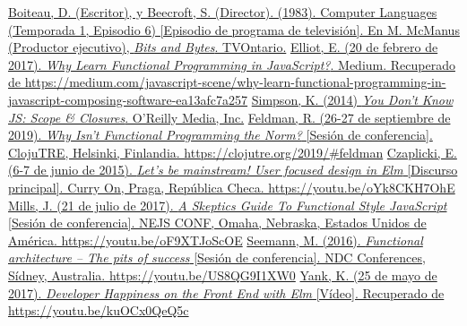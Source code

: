 \documentclass{article}
\begin{document}
\pagebreak
\begin{thebibliography}{99}
   \href{https://youtu.be/_C5AHaS1mOA}{Boiteau, D. (Escritor), y Beecroft, S. (Director). (1983). Computer Languages (Temporada 1, Episodio 6) [Episodio de programa de televisión]. En M. McManus (Productor ejecutivo), \textit{Bits and Bytes}. TVOntario.}
   \href{https://medium.com/javascript-scene/why-learn-functional-programming-in-javascript-composing-software-ea13afc7a257}{Elliot, E. (20 de febrero de 2017). \textit{Why Learn Functional Programming in JavaScript?}. Medium. Recuperado de https://medium.com/javascript-scene/why-learn-functional-programming-in-javascript-composing-software-ea13afc7a257}
   \href{https://github.com/getify/You-Dont-Know-JS/blob/1st-ed/scope\%20\&\%20closures/README.md\#you-dont-know-js-scope--closures}{Simpson, K. (2014) \textit{You Don't Know JS: Scope \& Closures}. O'Reilly Media, Inc.}
   \href{https://clojutre.org/2019/#feldman}{Feldman, R. (26-27 de septiembre de 2019). \textit{Why Isn't Functional Programming the Norm?} [Sesión de conferencia]. ClojuTRE, Helsinki, Finlandia. https://clojutre.org/2019/\#feldman}
   \href{https://youtu.be/oYk8CKH7OhE}{Czaplicki, E. (6-7 de junio de 2015). \textit{Let's be mainstream! User focused design in Elm} [Discurso principal]. Curry On, Praga, República Checa. https://youtu.be/oYk8CKH7OhE}
   \href{https://youtu.be/oF9XTJoScOE}{Mills, J. (21 de julio de 2017). \textit{A Skeptics Guide To Functional Style JavaScript} [Sesión de conferencia]. NEJS CONF, Omaha, Nebraska, Estados Unidos de América. https://youtu.be/oF9XTJoScOE}
   \href{https://youtu.be/US8QG9I1XW0}{Seemann, M. (2016). \textit{Functional architecture – The pits of success} [Sesión de conferencia]. NDC Conferences, Sídney, Australia. https://youtu.be/US8QG9I1XW0}
   \href{https://youtu.be/kuOCx0QeQ5c}{Yank, K. (25 de mayo de 2017). \textit{Developer Happiness on the Front End with Elm} [Vídeo]. Recuperado de https://youtu.be/kuOCx0QeQ5c}
\end{thebibliography}
\end{document}
